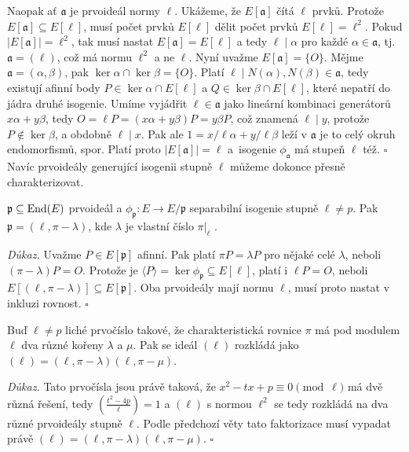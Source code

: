 \documentclass[12pt]{report}
\begin{document}
Naopak ať $\mathfrak{a}$ je prvoideál normy $\ell$. Ukážeme, že $E[\mathfrak{a}]$ čítá $\ell$ prvků. Protože $E[\mathfrak{a}] \subseteq E[\ell]$, musí počet prvků $E[\ell]$ dělit počet prvků $E[\ell] = \ell^2$. Pokud $\vert E[\mathfrak{a}] \vert = \ell^2$, tak musí nastat $E[\mathfrak{a}] = E[\ell]$ a tedy $\ell \mid \alpha$ pro každé $\alpha \in \mathfrak{a}$, tj. $\mathfrak{a} = (\ell)$, což má normu $\ell^2$ a ne $\ell$. Nyní uvažme $E[\mathfrak{a}] = \lbrace O \rbrace$. Mějme $\mathfrak{a} = (\alpha,\beta)$, pak $\ker \alpha \cap \ker \beta = \lbrace O \rbrace$. Platí $\ell \mid N(\alpha),N(\beta) \in \mathfrak{a}$, tedy existují afinní body $P \in \ker \alpha \cap E[\ell]$ a $Q \in \ker \beta \cap E[\ell]$, které nepatří do jádra druhé isogenie. Umíme vyjádřit $\ell \in \mathfrak{a}$ jako lineární kombinaci generátorů $x \alpha + y \beta$, tedy $O = \ell P = (x \alpha + y \beta) P  = y \beta P$, což znamená $\ell \mid y$, protože $P \not\in \ker \beta$, a obdobně $\ell \mid x$. Pak ale $1 = x/\ell \alpha + y/\ell \beta$ leží v $\mathfrak{a}$ je to celý okruh endomorfismů, spor. Platí proto $\vert E[\mathfrak{a}] \vert = \ell$ a~isogenie $\phi_\mathfrak{a}$ má stupeň $\ell$ též. \hfill $\square$\\

Navíc prvoideály generující isogenii stupně $\ell$ můžeme dokonce přesně charakterizovat.

\begin{veta}
$\mathfrak{p} \subseteq \operatorname{End}(E)$ prvoideál a $\phi_{\mathfrak{p}} : E \longrightarrow E/\mathfrak{p}$ separabilní isogenie stupně $\ell \neq p$. Pak $\mathfrak{p} = (\ell, \pi - \lambda)$, kde $\lambda$ je vlastní číslo $\pi \vert_{\ell}$ .
\end{veta}
\noindent \textit{Důkaz.} Uvažme $P \in E[\mathfrak{p}]$ afinní. Pak platí $\pi P = \lambda P$ pro nějaké celé $\lambda$, neboli $(\pi - \lambda) P = O$. Protože je $\langle P \rangle = \ker \phi_{\mathfrak{p}} \subseteq E[\ell]$, platí i $\ell P = O$, neboli $E[(\ell,\pi-\lambda)] \subseteq E[\mathfrak{p}]$. Oba prvoideály mají normu $\ell$, musí proto nastat v inkluzi rovnost.  \hfill $\square$\\ 

\begin{dusledek}
Buď $\ell \neq p$ liché prvočíslo takové, že charakteristická rovnice $\pi$ má pod modulem $\ell$ dva různé kořeny $\lambda$ a $\mu$. Pak se ideál $(\ell)$ rozkládá jako $(\ell) = (\ell,\pi - \lambda)(\ell, \pi - \mu)$.
\end{dusledek}
\noindent \textit{Důkaz.} Tato prvočísla jsou právě taková, že $x^2 - tx + p \equiv 0 \pmod{\ell}$ má dvě různá řešení, tedy $\genfrac{(}{)}{}{}{t^2-4p}{\ell} = 1$ a $(\ell)$ s normou $\ell^2$ se tedy rozkládá na dva různé prvoideály stupně $\ell$. Podle předchozí věty tato faktorizace musí vypadat právě $(\ell) = (\ell,\pi-\lambda)(\ell,\pi-\mu)$. \hfill $\square$\\
\end{document}
